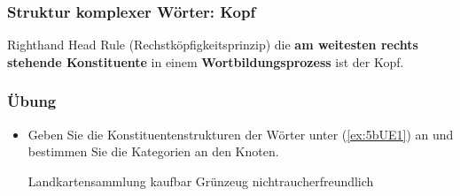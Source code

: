 \begin{frame}
\frametitle{Struktur komplexer Wörter: Kopf}


\begin{minipage}{.49\textwidth}

	\centering

\end{minipage}
%
\hfill%
%	
\begin{minipage}{.49\textwidth}
	
	\centering

\end{minipage}	

\bigskip 

\begin{block}{Righthand Head Rule (Rechstköpfigkeitsprinzip)}
	die \textbf{am weitesten rechts stehende Konstituente} in einem \textbf{Wortbildungsprozess} ist der Kopf.
\end{block}	

\end{frame}


\begin{frame}
	\frametitle{Übung}
	
	\begin{itemize}
		\item Geben Sie die Konstituentenstrukturen der Wörter unter (\ref{ex:5bUE1}) an und bestimmen Sie die Kategorien an den Knoten.
		
		\eal\label{ex:5bUE1} 
		\ex Landkartensammlung
		\ex kaufbar
		\ex Grünzeug
		\ex nichtraucherfreundlich
		\zl
	\end{itemize}
	
\end{frame}

